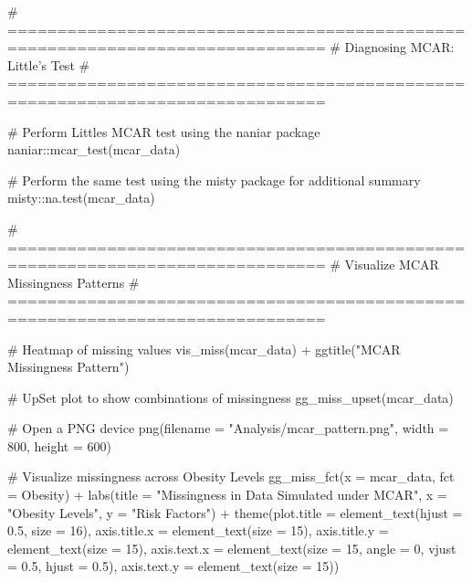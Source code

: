 \documentclass[
  letterpaper,
  DIV=11,
  numbers=noendperiod]{scrartcl}
\newenvironment{Shaded}{\begin{snugshade}}{\end{snugshade}}
\newcommand{\AttributeTok}[1]{\textcolor[rgb]{0.40,0.45,0.13}{#1}}
\newcommand{\CommentTok}[1]{\textcolor[rgb]{0.37,0.37,0.37}{#1}}
\newcommand{\DecValTok}[1]{\textcolor[rgb]{0.68,0.00,0.00}{#1}}
\newcommand{\FloatTok}[1]{\textcolor[rgb]{0.68,0.00,0.00}{#1}}
\newcommand{\FunctionTok}[1]{\textcolor[rgb]{0.28,0.35,0.67}{#1}}
\newcommand{\NormalTok}[1]{\textcolor[rgb]{0.00,0.23,0.31}{#1}}
\newcommand{\SpecialCharTok}[1]{\textcolor[rgb]{0.37,0.37,0.37}{#1}}
\newcommand{\StringTok}[1]{\textcolor[rgb]{0.13,0.47,0.30}{#1}}
\begin{document}
\begin{Shaded}
\begin{Highlighting}[]
\CommentTok{\# ==============================================================================}
\CommentTok{\# Diagnosing MCAR: Little’s Test}
\CommentTok{\# ==============================================================================}

\CommentTok{\# Perform Little\textquotesingle{}s MCAR test using the \textasciigrave{}naniar\textasciigrave{} package}
\NormalTok{naniar}\SpecialCharTok{::}\FunctionTok{mcar\_test}\NormalTok{(mcar\_data)}

\CommentTok{\# Perform the same test using the \textasciigrave{}misty\textasciigrave{} package for additional summary}
\NormalTok{misty}\SpecialCharTok{::}\FunctionTok{na.test}\NormalTok{(mcar\_data)}

\CommentTok{\# ==============================================================================}
\CommentTok{\# Visualize MCAR Missingness Patterns}
\CommentTok{\# ==============================================================================}

\CommentTok{\# Heatmap of missing values}
\FunctionTok{vis\_miss}\NormalTok{(mcar\_data) }\SpecialCharTok{+} \FunctionTok{ggtitle}\NormalTok{(}\StringTok{"MCAR Missingness Pattern"}\NormalTok{)}

\CommentTok{\# UpSet plot to show combinations of missingness}
\FunctionTok{gg\_miss\_upset}\NormalTok{(mcar\_data) }

\CommentTok{\# Open a PNG device}
\FunctionTok{png}\NormalTok{(}\AttributeTok{filename =} \StringTok{"Analysis/mcar\_pattern.png"}\NormalTok{, }\AttributeTok{width =} \DecValTok{800}\NormalTok{, }\AttributeTok{height =} \DecValTok{600}\NormalTok{)}

\CommentTok{\# Visualize missingness across Obesity Levels}
\FunctionTok{gg\_miss\_fct}\NormalTok{(}\AttributeTok{x =}\NormalTok{ mcar\_data, }\AttributeTok{fct =}\NormalTok{ Obesity) }\SpecialCharTok{+} 
  \FunctionTok{labs}\NormalTok{(}\AttributeTok{title =} \StringTok{"Missingness in Data Simulated under MCAR"}\NormalTok{,}
       \AttributeTok{x =} \StringTok{"Obesity Levels"}\NormalTok{, }\AttributeTok{y =} \StringTok{"Risk Factors"}\NormalTok{) }\SpecialCharTok{+}
\FunctionTok{theme}\NormalTok{(}\AttributeTok{plot.title =} \FunctionTok{element\_text}\NormalTok{(}\AttributeTok{hjust =} \FloatTok{0.5}\NormalTok{, }\AttributeTok{size =} \DecValTok{16}\NormalTok{),}
    \AttributeTok{axis.title.x =} \FunctionTok{element\_text}\NormalTok{(}\AttributeTok{size =} \DecValTok{15}\NormalTok{),}
    \AttributeTok{axis.title.y =} \FunctionTok{element\_text}\NormalTok{(}\AttributeTok{size =} \DecValTok{15}\NormalTok{),}
    \AttributeTok{axis.text.x =} \FunctionTok{element\_text}\NormalTok{(}\AttributeTok{size =} \DecValTok{15}\NormalTok{, }\AttributeTok{angle =} \DecValTok{0}\NormalTok{, }\AttributeTok{vjust =} \FloatTok{0.5}\NormalTok{, }\AttributeTok{hjust =} \FloatTok{0.5}\NormalTok{),}
    \AttributeTok{axis.text.y =} \FunctionTok{element\_text}\NormalTok{(}\AttributeTok{size =} \DecValTok{15}\NormalTok{))}


\end{Highlighting}
\end{Shaded}
\end{document}
